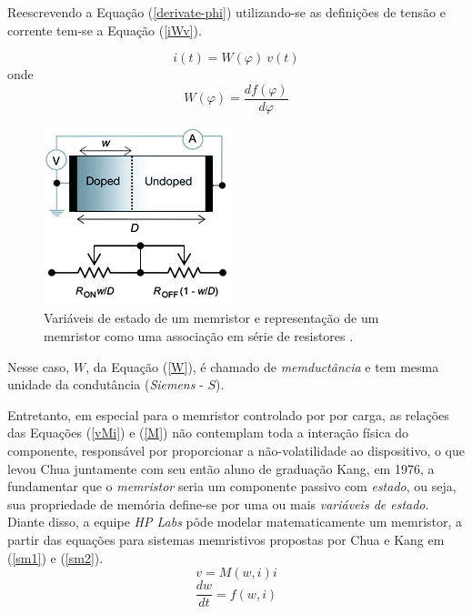 \documentclass{ceel}
\begin{document}
\begin{multicols}{2}
Reescrevendo a Equação (\ref{derivate-phi}) utilizando-se as definições de tensão e corrente tem-se a  Equação (\ref{iWv}).

\begin{equation}\label{iWv}
i(t)=W(\varphi)\ v(t)
\end{equation}
\noindent onde
\begin{equation} \label{W}
W(\varphi) =\dfrac{df(\varphi)}{d\varphi}
\end{equation}

\begin{figure}[H]
\centering
\includegraphics[width=0.7\columnwidth]{new-w}
\caption{Variáveis de estado de um memristor e representação de um memristor como uma associação em série de resistores \cite{image}.}\label{w}
\end{figure}

\vspace{0.2cm}
Nesse caso, $W$, da Equação (\ref{W}), é chamado de \textit{memductância} e tem mesma unidade da condutância (\textit{Siemens} - $S$).

Entretanto, em especial para o memristor controlado por por carga, as relações das Equações (\ref{vMi}) e (\ref{M}) não contemplam toda a interação física do componente, responsável por proporcionar a não-volatilidade ao dispositivo, o que levou Chua juntamente com seu então aluno de graduação Kang, em 1976, a fundamentar que o \emph{memristor} seria um componente passivo com \emph{estado}, ou seja, sua propriedade de memória define-se por uma ou mais \emph{variáveis de estado}.
Diante disso, a equipe \emph{HP Labs} pôde modelar matematicamente um memristor, a partir das equações para sistemas memristivos propostas por Chua e Kang \cite{1976} em (\ref{sm1}) e (\ref{sm2}).
\begin{equation}\label{sm1}
v=M(w, i)i
\end{equation}
\begin{equation}\label{sm2}
\dfrac{dw}{dt}=f(w, i)
\end{equation}
\vspace{0.00001cm}


\end{multicols}
\end{document}
